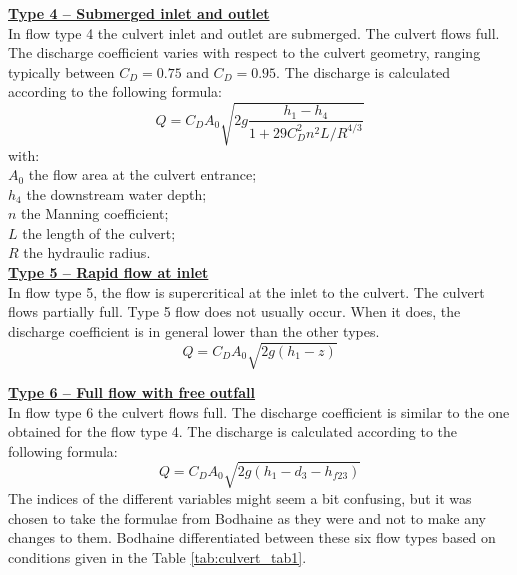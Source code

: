 \underline{\textbf{Type 4 -- Submerged inlet and outlet}}\\

In flow type 4 the culvert inlet and outlet are submerged. The culvert flows full. 
The discharge coefficient varies with respect to the culvert geometry, ranging 
typically between $C_D=0.75$ and $C_D=0.95$. 
The discharge is calculated according to the following formula:
\begin{equation}
Q=C_D A_0 \sqrt{2g\dfrac{h_1-h_4}{1+29C_D^2 n^2 L/R^{4/3}}}
\end{equation}
with:\\
$A_0$ the flow area at the culvert entrance;\\
$h_4$ the downstream water depth;\\
$n$ the Manning coefficient;\\
$L$ the length of the culvert;\\
$R$ the hydraulic radius.\\

\underline{\textbf{Type 5 -- Rapid flow at inlet}}\\

In flow type 5, the flow is supercritical at the inlet to the culvert. 
The culvert flows partially full. Type 5 flow does not usually occur. 
When it does, the discharge coefficient is in general lower than the other types.
\begin{equation}
Q=C_D A_0 \sqrt{2g(h_1-z)}
\end{equation}

\underline{\textbf{Type 6 -- Full flow with free outfall}}\\

In flow type 6 the culvert flows full. The discharge coefficient is similar to the 
one obtained for the flow type 4. 
The discharge is calculated according to the following formula:
\begin{equation}
Q=C_D A_0 \sqrt{2g(h_1-d_3-h_{f23})}
\end{equation}
The indices of the different variables might seem a bit confusing,
but it was chosen to take the formulae from Bodhaine as they were
and not to make any changes to them.
Bodhaine differentiated between these six flow types based on conditions
given in the Table \ref{tab:culvert_tab1}.

